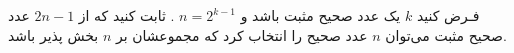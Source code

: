 \EXERCISE
فـرض کنید
$k$
یک عدد صحیح مثبت باشد و
$n = 2^{k-1}$
. ثابت کنید که از
$2n - 1$
عدد صحیح مثبت می‌توان
$n$
عدد صحیح را انتخاب کرد که مجموعشان بر
$n$
بخش پذیر باشد.